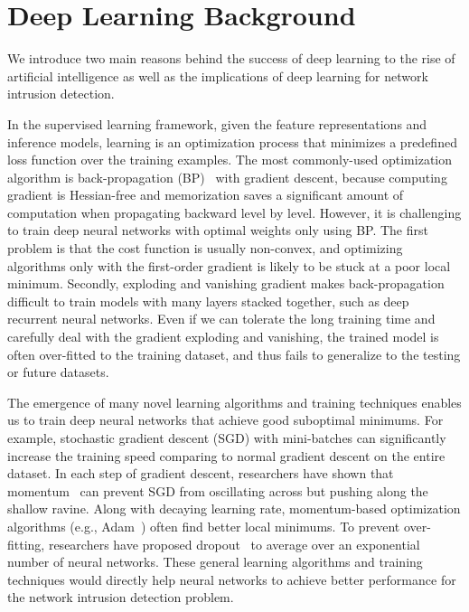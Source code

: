 \section{Deep Learning Background}
We introduce two main reasons behind the success of deep learning to the rise of artificial intelligence as well as the implications of deep learning for network intrusion detection.

In the supervised learning framework, given the feature representations and inference models, learning is an optimization process that minimizes a predefined loss function over the training examples.
The most commonly-used optimization algorithm is back-propagation (BP)~\cite{Backpropagation} with gradient descent,
because computing gradient is Hessian-free and memorization saves a significant amount of computation when propagating backward level by level.
However, it is challenging to train deep neural networks with optimal weights only using BP.
The first problem is that the cost function is usually non-convex, and
optimizing algorithms only with the first-order gradient is likely to be stuck at a poor local minimum.
Secondly, exploding and vanishing gradient makes back-propagation difficult to train models with many layers stacked together,
such as deep recurrent neural networks.
Even if we can tolerate the long training time and carefully deal with the gradient exploding and vanishing,
the trained model is often over-fitted to the training dataset, and thus fails to generalize to the testing or future datasets.

The emergence of many novel learning algorithms and training techniques enables us to train deep neural networks that achieve good suboptimal minimums.
For example, stochastic gradient descent (SGD) with mini-batches can significantly increase the training speed comparing
to normal gradient descent on the entire dataset.
In each step of gradient descent, researchers have shown that momentum~\cite{Momentum} can
prevent SGD from oscillating across but pushing along the shallow ravine.
Along with decaying learning rate, momentum-based optimization algorithms (e.g., Adam~\cite{Adam}) often find better local minimums.
To prevent over-fitting, researchers have proposed dropout~\cite{Dropout} to average over an exponential number of neural networks.
These general learning algorithms and training techniques would directly help neural networks to achieve better performance for the network intrusion detection problem.

